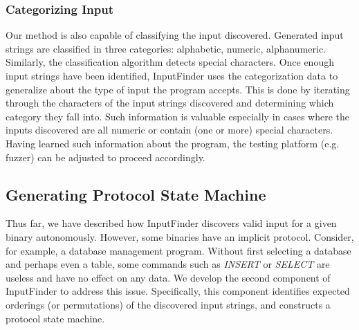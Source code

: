 \documentclass{acm_proc_article-sp}
\def \tool {InputFinder}
\begin{document}
\subsubsection{Categorizing Input}
Our method is also capable of classifying the input discovered.
Generated input strings are classified in three categories: alphabetic, numeric, alphanumeric.
Similarly, the classification algorithm detects special characters.
Once enough input strings have been identified, \tool{} uses the categorization data to generalize about the type of input the program accepts.
This is done by iterating through the characters of the input strings discovered and determining which category they fall into.
Such information is valuable especially in cases where the inputs discovered are all numeric or contain (one or more) special characters.
Having learned such information about the program, the testing platform (e.g. fuzzer) can be adjusted to proceed accordingly.

\subsection{Generating Protocol State Machine}
Thus far, we have described how \tool{} discovers valid input for a given binary autonomously.
However, some binaries have an implicit protocol.
Consider, for example, a database management program.
Without first selecting a database and perhaps even a table, some commands such as \textit{INSERT} or \textit{SELECT} are useless and have no effect on any data.
We develop the second component of \tool{} to address this issue.
Specifically, this component identifies expected orderings (or permutations) of the discovered input strings, and constructs a protocol state machine.
\end{document}
